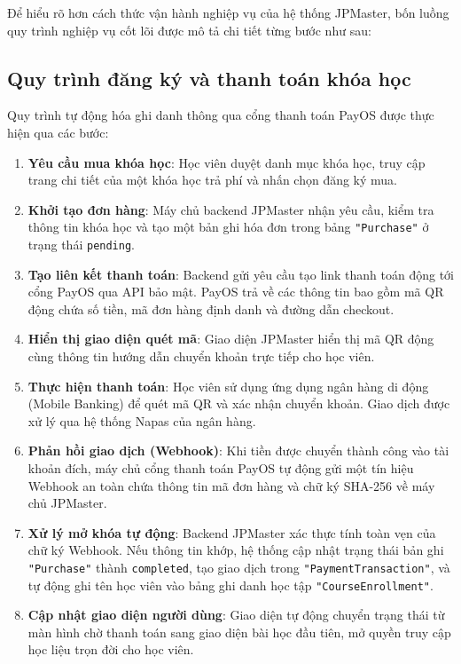\documentclass[../DoAn.tex]{subfiles}
\begin{document}
Để hiểu rõ hơn cách thức vận hành nghiệp vụ của hệ thống JPMaster, bốn luồng quy trình nghiệp vụ cốt lõi được mô tả chi tiết từng bước như sau:

\subsection{Quy trình đăng ký và thanh toán khóa học}
Quy trình tự động hóa ghi danh thông qua cổng thanh toán PayOS được thực hiện qua các bước:
\begin{enumerate}
    \item \textbf{Yêu cầu mua khóa học}: Học viên duyệt danh mục khóa học, truy cập trang chi tiết của một khóa học trả phí và nhấn chọn đăng ký mua.
    \item \textbf{Khởi tạo đơn hàng}: Máy chủ backend JPMaster nhận yêu cầu, kiểm tra thông tin khóa học và tạo một bản ghi hóa đơn trong bảng \texttt{"Purchase"} ở trạng thái \texttt{pending}.
    \item \textbf{Tạo liên kết thanh toán}: Backend gửi yêu cầu tạo link thanh toán động tới cổng PayOS qua API bảo mật. PayOS trả về các thông tin bao gồm mã QR động chứa số tiền, mã đơn hàng định danh và đường dẫn checkout.
    \item \textbf{Hiển thị giao diện quét mã}: Giao diện JPMaster hiển thị mã QR động cùng thông tin hướng dẫn chuyển khoản trực tiếp cho học viên.
    \item \textbf{Thực hiện thanh toán}: Học viên sử dụng ứng dụng ngân hàng di động (Mobile Banking) để quét mã QR và xác nhận chuyển khoản. Giao dịch được xử lý qua hệ thống Napas của ngân hàng.
    \item \textbf{Phản hồi giao dịch (Webhook)}: Khi tiền được chuyển thành công vào tài khoản đích, máy chủ cổng thanh toán PayOS tự động gửi một tín hiệu Webhook an toàn chứa thông tin mã đơn hàng và chữ ký SHA-256 về máy chủ JPMaster.
    \item \textbf{Xử lý mở khóa tự động}: Backend JPMaster xác thực tính toàn vẹn của chữ ký Webhook. Nếu thông tin khớp, hệ thống cập nhật trạng thái bản ghi \texttt{"Purchase"} thành \texttt{completed}, tạo giao dịch trong \texttt{"PaymentTransaction"}, và tự động ghi tên học viên vào bảng ghi danh học tập \texttt{"CourseEnrollment"}.
    \item \textbf{Cập nhật giao diện người dùng}: Giao diện tự động chuyển trạng thái từ màn hình chờ thanh toán sang giao diện bài học đầu tiên, mở quyền truy cập học liệu trọn đời cho học viên.
\end{enumerate}
\end{document}
